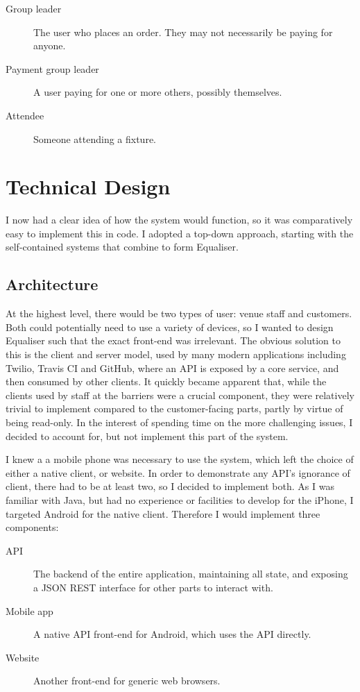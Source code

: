 \documentclass[12pt,a4paper]{bhamdissertation}
\begin{document}
\begin{description}
    \item[Group leader] The user who places an order. They may not necessarily be paying for anyone.
    \item[Payment group leader] A user paying for one or more others, possibly themselves.
    \item[Attendee] Someone attending a fixture.
\end{description}

\chapter{Technical Design} \label{technical_design}

I now had a clear idea of how the system would function, so it was comparatively easy to implement this in code. I adopted a top-down approach, starting with the self-contained systems that combine to form Equaliser.

\section{Architecture}

At the highest level, there would be two types of user: venue staff and customers. Both could potentially need to use a variety of devices, so I wanted to design Equaliser such that the exact front-end was irrelevant. The obvious solution to this is the client and server model, used by many modern applications including Twilio, Travis CI and GitHub, where an API is exposed by a core service, and then consumed by other clients. It quickly became apparent that, while the clients used by staff at the barriers were a crucial component, they were relatively trivial to implement compared to the customer-facing parts, partly by virtue of being read-only. In the interest of spending time on the more challenging issues, I decided to account for, but not implement this part of the system.

I knew a a mobile phone was necessary to use the system, which left the choice of either a native client, or website. In order to demonstrate any API's ignorance of client, there had to be at least two, so I decided to implement both. As I was familiar with Java, but had no experience or facilities to develop for the iPhone, I targeted Android for the native client. Therefore I would implement three components:

\begin{description}
    \item[API] The backend of the entire application, maintaining all state, and exposing a JSON REST interface for other parts to interact with.
    \item[Mobile app] A native API front-end for Android, which uses the API directly.
    \item[Website] Another front-end for generic web browsers.
\end{description}
\end{document}
